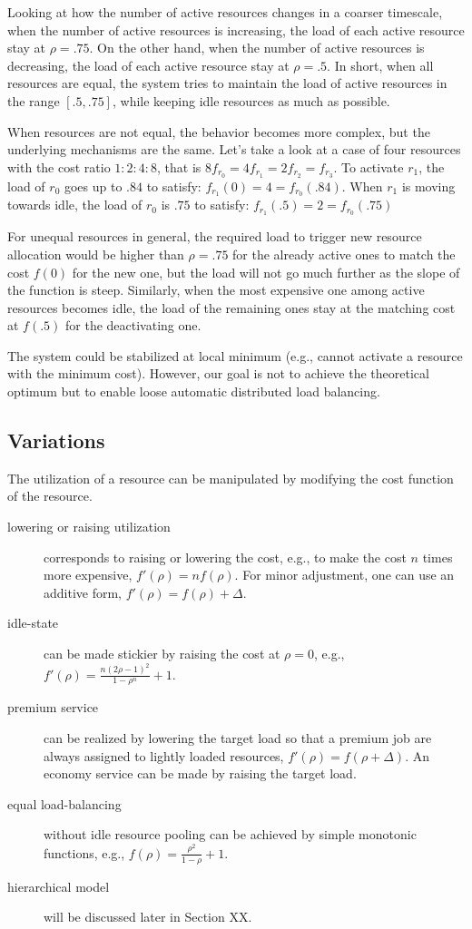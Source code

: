 Looking at how the number of active resources changes in a coarser
timescale,
when the number of active resources is increasing, the load of each
active resource stay at $\rho = .75$.
On the other hand, when the number of active resources is decreasing,
the load of each active resource stay at $\rho = .5$.
In short, when all resources are equal, the system tries to maintain
the load of active resources in the range $[.5, .75]$, while keeping
idle resources as much as possible.

When resources are not equal, the behavior becomes more complex, but
the underlying mechanisms are the same.
Let's take a look at a case of four resources with the cost ratio $1:2:4:8$,
that is $8 f_{r_{0}} = 4 f_{r_{1}} = 2 f_{r_{2}} = f_{r_{3}}$.
To activate $r_{1}$, the load of $r_{0}$ goes up to $.84$ to satisfy:
$f_{r_{1}}(0) = 4 = f_{r_{0}}(.84)$.
When $r_{1}$ is moving towards idle, the load of $r_{0}$ is $.75$ to
satisfy: $f_{r_{1}}(.5) = 2 = f_{r_{0}}(.75)$

For unequal resources in general, the required load to trigger new
resource allocation would be higher than $\rho = .75$ for the already
active ones to match the cost $f(0)$ for the new one, but the load
will not go much further as the slope of the function is steep.
Similarly, when the most expensive one among active resources becomes
idle, the load of the remaining ones stay at the matching cost at
$f(.5)$ for the deactivating one.

The system could be stabilized at local minimum (e.g., cannot activate
a resource with the minimum cost).
However, our goal is not to achieve the theoretical optimum but to
enable loose automatic distributed load balancing.

\subsection{Variations}

The utilization of a resource can be manipulated by modifying the cost
function of the resource.
\begin{description}
\item	[lowering or raising utilization] corresponds to raising or
	lowering the cost, e.g., to make the cost $n$ times
        more expensive, $f'(\rho) = n f(\rho)$.
        For minor adjustment, one can use an additive form,
        $f'(\rho) = f(\rho) + \Delta$.
\item	[idle-state] can be made stickier by raising the cost at
	  $\rho = 0$,
  	e.g., $f'(\rho) = \frac{n (2\rho - 1)^{2}}{1 - \rho^{n}} + 1$.
\item	[premium service] can be realized by lowering the target load so
        that a premium job are always assigned to lightly loaded resources, 
        $f'(\rho) = f(\rho + \Delta)$.
        An economy service can be made by raising the target load.
\item	[equal load-balancing] without idle resource pooling can be
        achieved by simple monotonic functions, e.g.,
        $f(\rho) = \frac{\rho^{2}}{1 - \rho} + 1$.
\item	[hierarchical model] will be discussed later in Section XX.
\end{description}

